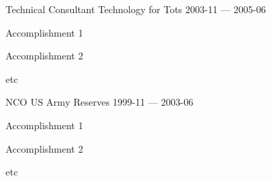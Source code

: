 


\begin{cventries}

  \cventry
    {Technical Consultant} %
    {Technology for Tots} %
    {} %
    {2003-11 — 2005-06} %
    {
      \begin{cvitems} %
        \item {Accomplishment 1}
        \item {Accomplishment 2}
        \item {etc}
      \end{cvitems}
    }


  \cventry
    {NCO} %
    {US Army Reserves} %
    {} %
    {1999-11 — 2003-06} %
    {
      \begin{cvitems} %
        \item {Accomplishment 1}
        \item {Accomplishment 2}
        \item {etc}
      \end{cvitems}
    }


\end{cventries}

